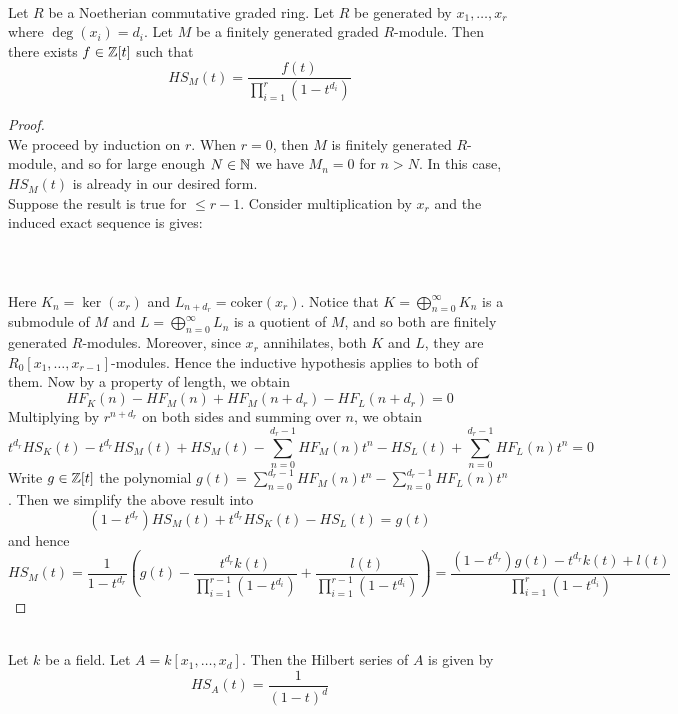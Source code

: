 \documentclass[a4paper]{article}
\begin{document}
\begin{prp}{}{}\\ Let $R$ be a Noetherian commutative graded ring. Let $R$ be generated by $x_1,\dots,x_r$ where $\deg(x_i)=d_i$. Let $M$ be a finitely generated graded $R$-module. Then there exists $f\in\mathbb{Z}[t]$ such that $$HS_M(t)=\frac{f(t)}{\prod_{i=1}^r(1-t^{d_i})}$$
\begin{proof}\\
We proceed by induction on $r$. When $r=0$, then $M$ is finitely generated $R$-module, and so for large enough $N\in\mathbb{N}$ we have $M_n=0$ for $n>N$. In this case, $HS_M(t)$ is already in our desired form. \\

Suppose the result is true for $\leq r-1$. Consider multiplication by $x_r$ and the induced exact sequence is gives: \\~\\
 \\~\\
Here $K_n=\ker(x_r)$ and $L_{n+d_r}=\text{coker}(x_r)$. Notice that $K=\bigoplus_{n=0}^\infty K_n$ is a submodule of $M$ and $L=\bigoplus_{n=0}^\infty L_n$ is a quotient of $M$, and so both are finitely generated $R$-modules. Moreover, since $x_r$ annihilates, both $K$ and $L$, they are $R_0[x_1,\dots,x_{r-1}]$-modules. Hence the inductive hypothesis applies to both of them. Now by a property of length, we obtain $$HF_K(n)-HF_M(n)+HF_M(n+d_r)-HF_L(n+d_r)=0$$ Multiplying by $r^{n+d_r}$ on both sides and summing over $n$, we obtain $$t^{d_r}HS_K(t)-t^{d_r}HS_M(t)+HS_M(t)-\sum_{n=0}^{d_r-1}HF_M(n)t^n-HS_L(t)+\sum_{n=0}^{d_r-1}HF_L(n)t^n=0$$ Write $g\in\mathbb{Z}[t]$ the polynomial $g(t)=\sum_{n=0}^{d_r-1}HF_M(n)t^n-\sum_{n=0}^{d_r-1}HF_L(n)t^n$. Then we simplify the above result into $$(1-t^{d_r})HS_M(t)+t^{d_r}HS_K(t)-HS_L(t)=g(t)$$ and hence $$HS_M(t)=\frac{1}{1-t^{d_r}}\left(g(t)-\frac{t^{d_r}k(t)}{\prod_{i=1}^{r-1}(1-t^{d_i})}+\frac{l(t)}{\prod_{i=1}^{r-1}(1-t^{d_i})}\right)=\frac{(1-t^{d_r})g(t)-t^{d_r}k(t)+l(t)}{\prod_{i=1}^r(1-t^{d_i})}$$
\end{proof}
\end{prp}

\begin{eg}{}{}\\
Let $k$ be a field. Let $A=k[x_1,\dots,x_d]$. Then the Hilbert series of $A$ is given by $$HS_A(t)=\frac{1}{(1-t)^d}$$
\end{eg}
\end{document}
